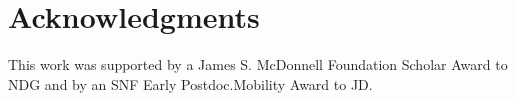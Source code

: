 \documentclass[10pt,letterpaper]{article}
\newcommand{\red}[1]{\textcolor{Red}{#1}}
\begin{document}
%
%

\section{Acknowledgments}

This work was supported by a James S. McDonnell Foundation Scholar Award to NDG and by an SNF Early Postdoc.Mobility Award to JD.

\small




\setlength{\bibleftmargin}{.125in}
\setlength{\bibindent}{-\bibleftmargin}


\end{document}
